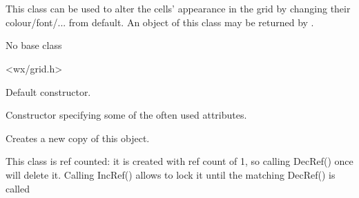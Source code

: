 %
%

\section{}\label{wxgridcellattr}

This class can be used to alter the cells' appearance in
the grid by changing their colour/font/... from default. An object of this
class may be returned by .


No base class


<wx/grid.h>




\label{wxgridcellattrwxgridcellattr}


Default constructor.


Constructor specifying some of the often used attributes.


\label{wxgridcellattrclone}


Creates a new copy of this object.


\label{wxgridcellattrincref}


This class is ref counted: it is created with ref count of 1, so
calling DecRef() once will delete it. Calling IncRef() allows to lock
it until the matching DecRef() is called


\label{wxgridcellattrdecref}


\label{wxgridcellattrsettextcolour}

